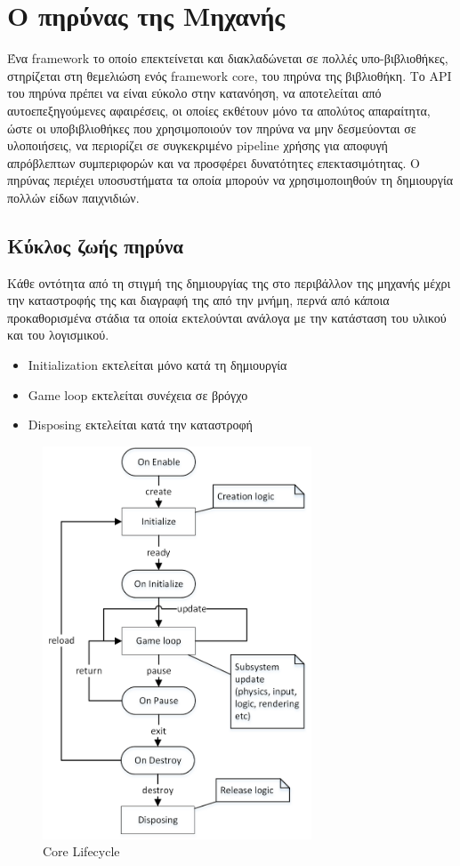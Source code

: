 	\chapter{Ο πηρύνας της Μηχανής}
	
	Ένα framework το οποίο επεκτείνεται και διακλαδώνεται σε πολλές υπο-βιβλιοθήκες, στηρίζεται στη θεμελιώση ενός framework core, του πηρύνα της βιβλιοθήκη. Το \gls{API} του πηρύνα πρέπει να είναι εύκολο στην κατανόηση, να αποτελείται από αυτοεπεξηγούμενες αφαιρέσεις, οι οποίες εκθέτουν μόνο τα απολύτος απαραίτητα, ώστε οι υποβιβλιοθήκες που χρησιμοποιούν τον πηρύνα να μην δεσμεύονται σε υλοποιήσεις, να περιορίζει σε συγκεκριμένο pipeline χρήσης για αποφυγή απρόβλεπτων συμπεριφορών και να προσφέρει δυνατότητες επεκτασιμότητας.  \cite{jaroslav08} Ο πηρύνας περιέχει υποσυστήματα τα οποία μπορούν να χρησιμοποιηθούν τη δημιουργία πολλών είδων παιχνιδιών.
		
	\section{Κύκλος ζωής πηρύνα}	
	Κάθε οντότητα από τη στιγμή της δημιουργίας της στο περιβάλλον της μηχανής μέχρι την καταστροφής της και διαγραφή της από την μνήμη, περνά από κάποια προκαθορισμένα στάδια τα οποία εκτελούνται ανάλογα με την κατάσταση του υλικού και του λογισμικού.
	
	\begin{itemize}
		\item Initialization εκτελείται μόνο κατά τη δημιουργία
		\item Game loop εκτελείται συνέχεια σε βρόγχο
		\item Disposing εκτελείται κατά την καταστροφή
	\end{itemize}
	
	\begin{figure}[h!]
		\centering
		\includegraphics[width=80mm]{Images/core_lifecycle}
		\caption{Core Lifecycle}
		\label{fig:corelifecycle}
	\end{figure}
		
